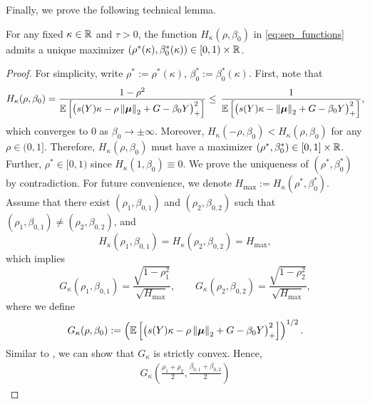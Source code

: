 Finally, we prove the following technical lemma.
\begin{lem}
    \label{lem:H_kappa_1}
    For any fixed $\kappa \in \mathbb{R}$ and $\tau > 0$, the function $H_\kappa(\rho, \beta_0)$ in \cref{eq:sep_functions} admits a unique maximizer $(\rho^*(\kappa), \beta_0^*(\kappa)) \in [0, 1) \times \mathbb{R}$.
\end{lem}
\begin{proof}
    For simplicity, write $\rho^* := \rho^*(\kappa)$, $\beta_0^* := \beta_0^*(\kappa)$. First, note that
    \begin{equation*}
        H_\kappa(\rho, \beta_0) = \frac{1 - \rho^2}{\mathbb{E}\left[ \bigl(  s(Y) \kappa - \rho \left\|{\text{\boldmath $\mu$}}\right\|_2 + G - \beta_0 Y \bigr)_+^2 \right]} \le \, \frac{1}{\mathbb{E}\left[ \bigl(  s(Y) \kappa - \left\|{\text{\boldmath $\mu$}}\right\|_2 + G - \beta_0 Y \bigr)_+^2 \right]},
    \end{equation*}
    which converges to $0$ as $\beta_0 \to \pm\infty$. Moreover, $H_\kappa(-\rho, \beta_0) < H_\kappa(\rho, \beta_0)$ for any $\rho \in (0, 1]$. Therefore, $H_\kappa(\rho, \beta_0)$ must have a maximizer $(\rho^*, \beta_0^*) \in [0, 1] \times \mathbb{R}$. Further, $\rho^* \in [0, 1)$ since $H_\kappa(1, \beta_0) \equiv 0$. We prove the uniqueness of $(\rho^*, \beta_0^*)$ by contradiction. For future convenience, we denote $H_{\max} := H_{\kappa} (\rho^*, \beta_0^*)$. Assume that there exist $(\rho_1, \beta_{0, 1})$ and $(\rho_2, \beta_{0, 2})$ such that $(\rho_1, \beta_{0, 1}) \neq (\rho_2, \beta_{0, 2})$, and
    \begin{equation*}
        H_{\kappa} (\rho_1, \beta_{0, 1}) = H_{\kappa} (\rho_2, \beta_{0, 2}) = H_{\max},
    \end{equation*}
    which implies
    \begin{equation*}
        G_{\kappa} (\rho_1, \beta_{0, 1}) = \frac{\sqrt{1 - \rho_1^2}}{\sqrt{H_{\max}}}, 
        \qquad 
        G_{\kappa} (\rho_2, \beta_{0, 2}) = \frac{\sqrt{1 - \rho_2^2}}{\sqrt{H_{\max}}},
    \end{equation*}
    where we define
    \begin{equation*}
        G_\kappa(\rho, \beta_0) := \left( \mathbb{E}\left[ \bigl(  s(Y) \kappa - \rho \left\|{\text{\boldmath $\mu$}}\right\|_2 + G - \beta_0 Y \bigr)_+^2 \right] \right)^{1/2}.
    \end{equation*}
    Similar to \cite[Lemma 6.3]{montanari2023generalizationerrormaxmarginlinear}, we can show that $G_{\kappa}$ is strictly convex. Hence,
    \begin{align*}
        G_{\kappa} \left( \frac{\rho_1 + \rho_2}{2}, \frac{\beta_{0, 1} + \beta_{0, 2}}{2} \right) 

\end{align*}
\end{proof}
